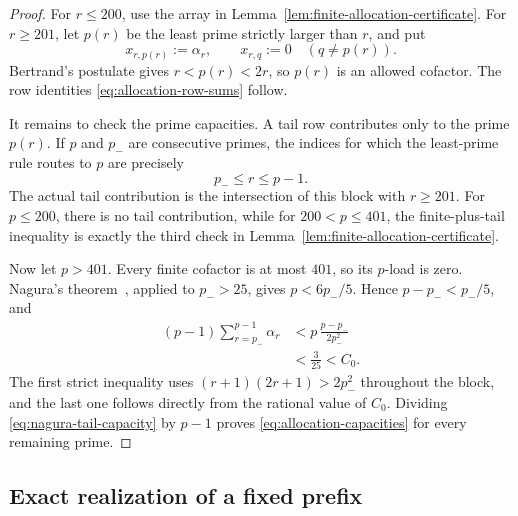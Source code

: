 \documentclass[11pt]{article}
\numberwithin{equation}{section}
\theoremstyle{definition}
\theoremstyle{remark}
\newcommand{\1}{\mathbf 1}
\begin{document}
\begin{proof}
For \(r\le200\), use the array in
Lemma~\ref{lem:finite-allocation-certificate}.  For \(r\ge201\), let \(p(r)\)
be the least prime strictly larger than \(r\), and put
\[
          x_{r,p(r)}:=\alpha_r,
          \qquad x_{r,q}:=0\quad(q\ne p(r)).
\]
Bertrand's postulate gives \(r<p(r)<2r\), so \(p(r)\) is an allowed
cofactor.  The row identities \eqref{eq:allocation-row-sums} follow.

It remains to check the prime capacities.  A tail row contributes only
to the prime \(p(r)\).  If \(p\) and \(p_-\) are consecutive primes, the
indices for which the least-prime rule routes to \(p\) are precisely
\begin{equation}
                   p_-\le r\le p-1.
                   \label{eq:least-prime-tail-block}
\end{equation}
The actual tail contribution is the intersection of this block with
\(r\ge201\).
For \(p\le200\), there is no tail contribution, while for
\(200<p\le401\), the finite-plus-tail inequality is exactly the third
check in Lemma~\ref{lem:finite-allocation-certificate}.

Now let \(p>401\).  Every finite cofactor is at most \(401\), so its
\(p\)-load is zero.  Nagura's theorem~\cite{Nagura1952}, applied to
\(p_->25\), gives \(p<6p_-/5\).  Hence \(p-p_-<p_-/5\), and
\begin{equation}
 \begin{split}
 (p-1)\sum_{r=p_-}^{p-1}\alpha_r
  &<
   p\,\frac{p-p_-}{2p_-^2}\\
  &<\frac{3}{25}
   <C_0.
 \end{split}
 \label{eq:nagura-tail-capacity}
\end{equation}
The first strict inequality uses
\((r+1)(2r+1)>2p_-^2\) throughout the block, and the last one follows
directly from the rational value of \(C_0\).  Dividing
\eqref{eq:nagura-tail-capacity} by \(p-1\) proves
\eqref{eq:allocation-capacities} for every remaining prime.
\end{proof}

\subsection{Exact realization of a fixed prefix}
\label{sec:fixed-prefix-anchors}
\end{document}
